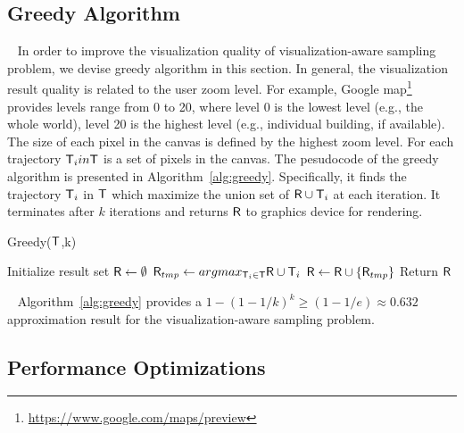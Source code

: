 \subsection{Greedy Algorithm}~\label{sec:greedy}
In order to improve the visualization quality of visualization-aware sampling problem, we devise greedy algorithm in this section.
In general, the visualization result quality is related to the user zoom level.
For example, Google map\footnote{\url{https://www.google.com/maps/preview}} provides levels range from 0 to 20, 
where level 0 is the lowest level (e.g., the whole world), level 20 is the highest level (e.g., individual building, if available).
The size of each pixel in the canvas is defined by the highest zoom level.
For each trajectory $\mathsf{T}_i in \mathsf{T}$ is a set of pixels in the canvas.
The pesudocode of the greedy algorithm is presented in Algorithm~\ref{alg:greedy}.
Specifically, it finds the trajectory $\mathsf{T}_i$ in $\mathsf{T}$ which maximize the union set of $\mathsf{R} \cup \mathsf{T}_i$ at each iteration.
It terminates after $k$ iterations and returns $\mathsf{R}$ to graphics device for rendering.

\begin{algorithm}
    \caption{Greedy($\mathsf{T}$,k)} \label{alg:greedy}
    \begin{algorithmic}[1]
    \State Initialize result set $\mathsf{R} \leftarrow \emptyset$
        \State $\mathsf{R}_{tmp} \leftarrow argmax_{\mathsf{T}_i \in \mathsf{T}} \mathsf{R} \cup \mathsf{T}_i$
        \State $\mathsf{R} \leftarrow \mathsf{R} \cup \{ \mathsf{R}_{tmp} \}$
    \EndWhile
    \State Return $\mathsf{R}$
    \end{algorithmic}
\end{algorithm}

\begin{theorem}~\label{the:ratio}
Algorithm~\ref{alg:greedy} provides a $1-(1-1/k)^k \geq (1-1/e) \approx 0.632$ approximation result for the visualization-aware sampling problem.
\end{theorem}

\subsection{Performance Optimizations}



